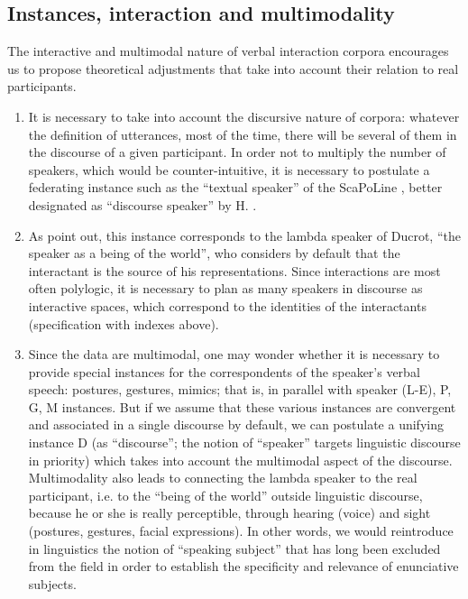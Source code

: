 \documentclass[output=paper]{langscibook}
\begin{document}
\subsection{Instances, interaction and multimodality}

{The interactive and multimodal nature of verbal interaction corpora encourages us to propose theoretical adjustments that take into account their relation to real participants.}

\begin{enumerate}

\item It is necessary to take into account the discursive nature of corpora: whatever the definition of utterances, most of the time, there will be several of them in the discourse of a given participant. In order not to multiply the number of speakers, which would be counter-intuitive, it is necessary to postulate a federating instance such as the “textual speaker” of the ScaPoLine \citep{NølkeEtAl2004}, better designated as “discourse speaker” by H. \citet[128]{Kronning2014}.

\item As \citet{DendaleColtier2005} point out, this instance corresponds to the lambda speaker of Ducrot, “the speaker as a being of the world”, who considers by default that the interactant is the source of his representations. Since interactions are most often polylogic, it is necessary to plan as many speakers in discourse as interactive spaces, which correspond to the identities of the interactants (specification with indexes above).

\item Since the data are multimodal, one may wonder whether it is necessary to provide special instances for the correspondents of the speaker’s verbal speech: postures, gestures, mimics; that is, in parallel with speaker (L-E), P, G, M instances. But if we assume that these various instances are convergent and associated in a single discourse by default, we can postulate a unifying instance D (as “discourse”; the notion of “speaker” targets linguistic discourse in priority) which takes into account the multimodal aspect of the discourse. Multimodality also leads to connecting the lambda speaker to the real participant, i.e. to the “being of the world” outside linguistic discourse, because he or she is really perceptible, through hearing (voice) and sight (postures, gestures, facial expressions). In other words, we would reintroduce in linguistics the notion of “speaking subject” that has long been excluded from the field in order to establish the specificity and relevance of enunciative subjects.


\end{enumerate}
\end{document}

